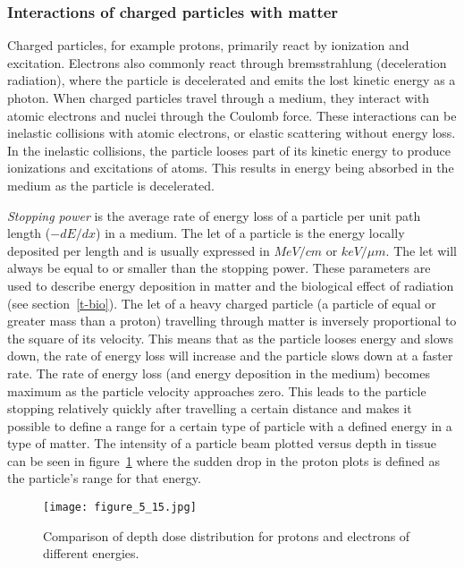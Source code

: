 \documentclass[../main/thesis.tex]{subfiles}
\begin{document}
\subsubsection{Interactions of charged particles with matter}
\label{t-cp}
Charged particles, for example protons, primarily react by ionization and excitation. Electrons also commonly react through bremsstrahlung (deceleration radiation), where the particle is decelerated and emits the lost kinetic energy as a photon. When charged particles travel through a medium, they interact with atomic electrons and nuclei through the Coulomb force. These interactions can be inelastic collisions with atomic electrons, or elastic scattering without energy loss. In the inelastic collisions, the particle looses part of its kinetic energy to produce ionizations and excitations of atoms. This results in energy being absorbed in the medium as the particle is decelerated. \citep[chap. 5 $\&$ 27]{Khan} 

\textit{Stopping power} is the average rate of energy loss of a particle per unit path length ($-dE/dx$) in a medium. The \gls{let} of a particle is the energy locally deposited per length and is usually expressed in $MeV/cm$ or $keV/{\mu}m$. The \gls{let} will always be equal to or smaller than the stopping power. These parameters are used to describe energy deposition in matter and the biological effect of radiation (see section~\ref{t-bio}). The \gls{let} of a heavy charged particle (a particle of equal or greater mass than a proton) travelling through matter is inversely proportional to the square of its velocity. This means that as the particle looses energy and slows down, the rate of energy loss will increase and the particle slows down at a faster rate. The rate of energy loss (and energy deposition in the medium) becomes maximum as the particle velocity approaches zero. This leads to the particle stopping relatively quickly after travelling a certain distance and makes it possible to define a range for a certain type of particle with a defined energy in a type of matter. The intensity of a particle beam plotted versus depth in tissue can be seen in figure~\ref{fig-range} where the sudden drop in the proton plots is defined as the particle's range for that energy. \citep[chap. 27]{Khan}

\begin{figure}[h]
	\centering
	\texttt{[image: figure\_5\_15.jpg]}
	\caption{Comparison of depth dose distribution for protons and electrons of different energies. \citep[fig. 5.15]{Khan}}
	\label{fig-range}
\end{figure}
\end{document}
